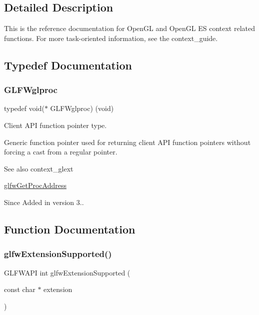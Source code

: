 \subsection{Detailed Description}
This is the reference documentation for Open\+GL and Open\+GL ES context related functions. For more task-\/oriented information, see the context\+\_\+guide. 

\subsection{Typedef Documentation}
\mbox{\label{group__context_ga3d47c2d2fbe0be9c505d0e04e91a133c}} 
\subsubsection{\texorpdfstring{G\+L\+F\+Wglproc}{GLFWglproc}}
{\footnotesize\ttfamily typedef void($\ast$ G\+L\+F\+Wglproc) (void)}



Client A\+PI function pointer type. 

Generic function pointer used for returning client A\+PI function pointers without forcing a cast from a regular pointer.

\begin{DoxySeeAlso}{See also}
context\+\_\+glext 

\hyperlink{group__context_ga0e8af175218929615c16e74938c10f2a}{glfw\+Get\+Proc\+Address}
\end{DoxySeeAlso}
\begin{DoxySince}{Since}
Added in version 3.. 
\end{DoxySince}


\subsection{Function Documentation}
\mbox{\label{group__context_ga9a28c712d35f9e43534e1d03b051c04c}} 
\subsubsection{\texorpdfstring{glfw\+Extension\+Supported()}{glfwExtensionSupported()}}
{\footnotesize\ttfamily G\+L\+F\+W\+A\+PI int glfw\+Extension\+Supported (\begin{DoxyParamCaption}\item[{const char $\ast$}]{extension }\end{DoxyParamCaption})}



